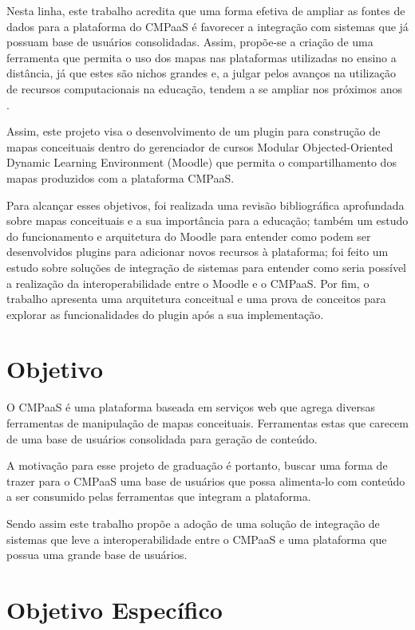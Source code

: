 \documentclass[
	12pt,				%
	openright,			%
	oneside,			%
	a4paper,			%
	english,			%
	french,				%
	spanish,			%
	brazil				%
	]{abntex2}
\begin{document}
Nesta linha, este trabalho acredita que uma forma efetiva de ampliar as fontes de dados para a plataforma do CMPaaS é favorecer a integração com sistemas que já possuam base de usuários consolidadas. Assim, propõe-se a criação de uma ferramenta que permita o uso dos mapas nas plataformas utilizadas no ensino a distância, já que estes são nichos grandes e, a julgar pelos avanços na utilização de recursos computacionais na educação, tendem a se ampliar nos próximos anos \cite{ribeiro2012}.

Assim, este projeto visa o desenvolvimento de um plugin para construção de mapas conceituais dentro do gerenciador de cursos Modular Objected-Oriented Dynamic Learning Environment (Moodle) que permita o compartilhamento dos mapas produzidos com a plataforma CMPaaS.

Para alcançar esses objetivos, foi realizada uma revisão bibliográfica aprofundada sobre mapas conceituais e a sua importância para a educação; também um  estudo do funcionamento e arquitetura do Moodle para entender como podem ser desenvolvidos plugins para adicionar novos recursos à plataforma;  foi feito um estudo sobre soluções de integração de sistemas para entender como seria possível a realização da interoperabilidade entre o Moodle e o CMPaaS. Por fim, o trabalho apresenta uma arquitetura conceitual e uma prova de conceitos para explorar as funcionalidades do plugin após a sua implementação.

\section{Objetivo} 
 
O CMPaaS é uma plataforma baseada em serviços web que agrega diversas ferramentas de manipulação de mapas conceituais. Ferramentas estas que carecem de uma base de usuários consolidada para geração de conteúdo.

A motivação para esse projeto de graduação é portanto, buscar uma forma de trazer para o CMPaaS uma base de usuários que possa alimenta-lo com conteúdo a ser consumido pelas ferramentas que integram a plataforma.

Sendo assim este trabalho propõe a adoção de uma solução de integração de sistemas que leve a interoperabilidade entre o CMPaaS e uma plataforma que possua uma grande base de usuários.

\section{Objetivo Específico}
\end{document}

